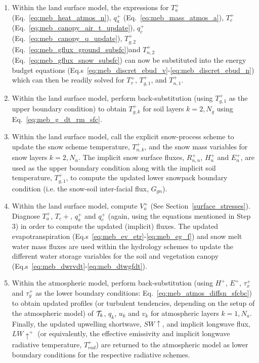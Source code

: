 {\begin{enumerate}

\item Within the land surface model, 
  the expressions for $T_{a}^+$ (Eq.~\ref{eq:meb_heat_atmos_n}), 
  $q_a^+$ (Eq.~\ref{eq:meb_mass_atmos_a}),
  $T_{c}^+$ (Eq.~\ref{eq:meb_canopy_air_t_update}), 
  $q_c^+$ (Eq.~\ref{eq:meb_canopy_q_update}), $T_{g,2}^+$
  (Eq.~\ref{eq:meb_gflux_ground_subsfc})and 
  $T_{n,2}^+$ (Eq.~\ref{eq:meb_gflux_snow_subsfc})
  can now be substituted into the energy budget equations 
  (Eq.s~\ref{eq:meb_discret_ebud_v}-\ref{eq:meb_discret_ebud_n})
  which can then be readily solved for  $T_v^+$, $T_{g,1}^+$, and
  $T_{n,1}^+$. 

\item Within the land surface model, perform back-substitution (using
  $T_{g,1}^+$ as the upper boundary condition) to obtain $T_{g,k}^+$
  for soil layers $k=2,N_g$ using Eq.~\ref{eq:meb_g_dt_rm_sfc}. 


\item Within the land surface model, call the explicit snow-process scheme 
  to update the snow scheme temperature, $T_{n,k}^+$, 
  and the snow mass variables
  for snow layers $k=2,N_n$.
  The implicit snow surface
  fluxes, $R_{n,n}^+$, $H_n^+$ and $E_n^+$, are used as the upper
  boundary condition along with the implicit soil
  temperature, $T_{g,1}^+$, to compute the updated lower snowpack boundary
  condition (i.e. the snow-soil inter-facial flux, $G_{gn}$).

\item Within the land surface model, compute $V_a^+$ (See Section~\ref{surface_stresses}).
  Diagnose $T_a^+$, $T_c+$, $q_a^+$ and $q_c^+$ (again, using the equations
  mentioned in Step 3)
  in order to compute the updated (implicit) fluxes. 
  The updated evapotranspiration (Eq.s~\ref{eq:meb_ev_etr}-\ref{eq:meb_eg_f}) 
  and snow melt water 
  mass fluxes are used within the hydrology schemes
  to update the different water storage variables for the soil and
  vegetation canopy (Eq.s~\ref{eq:meb_dwrvdt}-\ref{eq:meb_dtwgfdt}).

\item Within the atmospheric model, perform back-substitution (using
  $H^+$, $E^+$, $\tau_x^+$ and $\tau_y^+$  as the lower boundary
  conditions: Eq.~\ref{eq:meb_atmos_diffsn_sfcbc})
  to obtain updated profiles (or turbulent tendencies, depending on
  the setup of the atmospheric model) of ${\cal T}_k$, $q_k$, $u_k$ and $v_k$
  for atmospheric layers $k=1,N_a$. 
  Finally, the updated
  upwelling shortwave, $SW\uparrow$,  and implicit longwave flux, $LW\uparrow^+$ (or equivalently, the
  effective emissivity and implicit longwave radiative temperature, $T_{rad}^+$) are
  returned to the atmospheric model as lower boundary conditions for the
  respective radiative schemes. 



\end{enumerate}}
